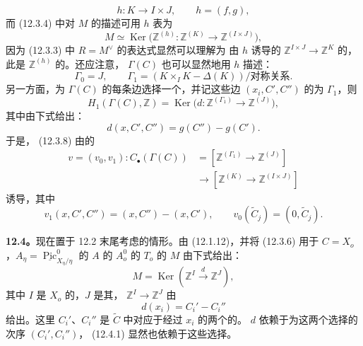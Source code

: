 \[
 h:K\longrightarrow I\times J,\qquad h=(f,g),\tag{12.3.9}
\]
而 (12.3.4) 中对 $M$ 的描述可用 $h$ 表为
\[
 M\simeq\operatorname{Ker}\bigl(\mathbb Z^{(h)}:
 \mathbb Z^{(K)}\longrightarrow\mathbb Z^{(I\times J)}\bigr),\tag{12.3.10}
\]
因为 (12.3.3) 中 $R=M^\vee$ 的表达式显然可以理解为
由 $h$ 诱导的 $\mathbb Z^{I\times J}\to\mathbb Z^K$ 的，此是 $\mathbb Z^{(h)}$ 的。还应注意， $\Gamma(C)$ 也可以显然地用 $h$ 描述：
\[
 \Gamma_0=J,\qquad
 \Gamma_1=(K\times_I K-\Delta(K))/\text{对称关系}.
\]
另一方面，为 $\Gamma(C)$ 的每条边选择一个，并记这些边 $(x_i,C',C'')$ 的为 $\Gamma_1$，则
\[
 H_1(\Gamma(C),\mathbb Z)
 =\operatorname{Ker}\bigl(d:\mathbb Z^{(\Gamma_1)}\longrightarrow\mathbb Z^{(J)}\bigr),\tag{12.3.11}
\]
其中由下式给出：
\[
 d(x,C',C'')=g(C'')-g(C').\tag{12.3.12}
\]
于是， (12.3.8) 由的
\[
 \begin{split}
 v=(v_0,v_1):C_\bullet(\Gamma(C))
 &=[\mathbb Z^{(\Gamma_1)}\longrightarrow\mathbb Z^{(J)}]\\
 &\longrightarrow[\mathbb Z^{(K)}\longrightarrow\mathbb Z^{(I\times J)}]
 \end{split}\tag{12.3.13}
\]
诱导，其中
\[
 v_1(x,C',C'')=(x,C'')-(x,C'),\qquad
 v_0(\widetilde C_j)=(0,\widetilde C_j).\tag{12.3.14}
\]

\textbf{12.4。}现在置于 12.2 末尾考虑的情形。由 (12.1.12)，并将 (12.3.6) 用于 $C=X_o$，$A_\eta=\underline{\operatorname{Pic}}_{X_\eta/\eta}^0$ 的 $A$ 的 $A_o^0$ 的 $T_o$ 的 $M$ 由下式给出：
\[
 M=\operatorname{Ker}(\mathbb Z^I\xrightarrow d\mathbb Z^J),\tag{12.4.1}
\]
其中 $I$ 是 $X_o$ 的，$J$ 是其， $\mathbb Z^I\to\mathbb Z^J$ 由
\[
 d(x_i)=C_i'-C_i''\tag{12.4.2}
\]
给出。这里 $C_i'$、$C_i''$ 是 $\widetilde C$ 中对应于经过 $x_i$ 的两个的。 $d$ 依赖于为这两个选择的次序 $(C_i',C_i'')$， (12.4.1) 显然也依赖于这些选择。

